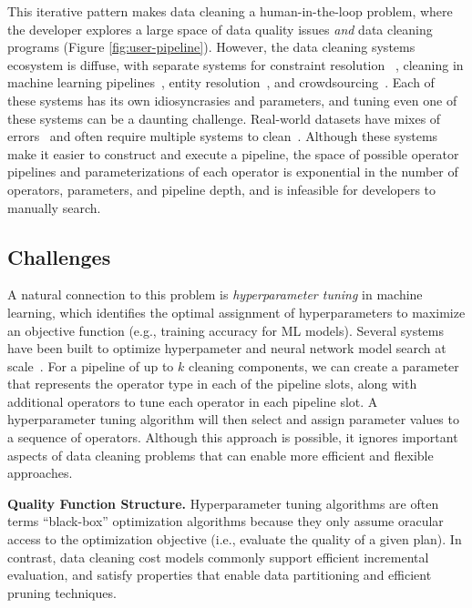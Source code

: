 This iterative pattern makes data cleaning a human-in-the-loop problem, where the developer explores a large space of data quality issues {\it and} data cleaning programs (Figure \ref{fig:user-pipeline}).  However, the data cleaning systems ecosystem is diffuse, with separate systems for constraint resolution ~\cite{rekatsinas2017holoclean}, cleaning in machine learning pipelines~\cite{DBLP:journals/pvldb/KrishnanWWFG16}, entity resolution~\cite{mudgal2018deep, doan2018toward}, and crowdsourcing~\cite{DBLP:journals/pvldb/HaasKWF015}.
Each of these systems has its own idiosyncrasies and parameters, and tuning even one of these systems can be a daunting challenge.
Real-world datasets have mixes of errors~\cite{krishnan2016hilda} and often require multiple systems to clean~\cite{DBLP:conf/sigmod/ChuIKW16}.
Although these systems make it easier to construct and execute a pipeline, the space of possible operator pipelines and parameterizations of each operator is exponential in the number of operators, parameters, and pipeline depth, and is infeasible for developers to manually search.


\subsection{Challenges}
A natural connection to this problem is \emph{hyperparameter tuning} in machine learning, which identifies the optimal assignment of hyperparameters to maximize an objective function (e.g., training accuracy for ML models).
Several systems have been built to optimize hyperpameter and neural network model search at scale~\cite{li2017hyperband, sparks2017keystoneml, baylor2017tfx, golovin2017google, liaw2018tune}.
For a pipeline of up to $k$ cleaning components, we can create a parameter that represents the operator type in each of the pipeline slots, along with additional operators to tune each operator in each pipeline slot.  A hyperparameter tuning algorithm will then select and assign parameter values to a sequence of operators. Although this approach is possible, it ignores important aspects of data cleaning problems that can enable more efficient and flexible approaches.  

\vspace{0.5em}
\noindent \textbf{Quality Function Structure. } Hyperparameter tuning algorithms are often terms ``black-box'' optimization algorithms because they only assume oracular access to the optimization objective (i.e., evaluate the quality of a given plan). In contrast, data cleaning cost models commonly support efficient incremental evaluation, and satisfy properties that enable data partitioning and efficient pruning techniques.  

